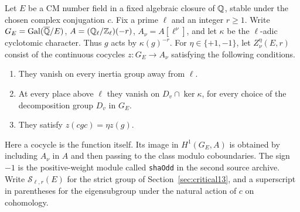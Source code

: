\documentclass[a4paper,11pt]{article}
\theoremstyle{definition}
\theoremstyle{remark}
\newcommand{\ZZ}{\mathbb Z}\newcommand{\ord}{\operatorname{ord}}
\numberwithin{equation}{section}
\begin{document}
Let \(E\) be a CM number field in a fixed algebraic closure of
\(\mathbb Q\), stable under the chosen complex conjugation \(c\).
Fix a prime \(\ell\) and an integer \(r\ge1\). Write
\(G_E=\operatorname{Gal}(\overline{\mathbb Q}/E)\),
\(A=(\QQ_\ell/\ZZ_\ell)(-r)\),
\(A_\nu=A[\ell^\nu]\), and let \(\kappa\) be the
\(\ell\)-adic cyclotomic character. Thus \(g\) acts by
\(\kappa(g)^{-r}\). For \(\eta\in\{+1,-1\}\), let
\(Z^\eta_\nu(E,r)\) consist of the continuous cocycles
\(z:G_E\to A_\nu\) satisfying the following conditions.
\begin{enumerate}
\item They vanish on every inertia group away from \(\ell\).
\item At every place above \(\ell\) they vanish on
\(D_v\cap\ker\kappa\), for every choice of the decomposition group
\(D_v\) in \(G_E\).
\item They satisfy \(z(cgc)=\eta z(g)\).
\end{enumerate}
Here a cocycle is the function itself. Its image in
\(H^1(G_E,A)\) is obtained by including \(A_\nu\) in \(A\) and
then passing to the class modulo coboundaries. The sign \(-1\)
is the positive-weight module called \texttt{shaOdd} in the
second source archive. Write \(\mathcal S_{\ell,r}(E)\) for the
strict group of Section~\ref{sec:critical13}, and a superscript
in parentheses for the eigensubgroup under the natural action
of \(c\) on cohomology.
\end{document}
